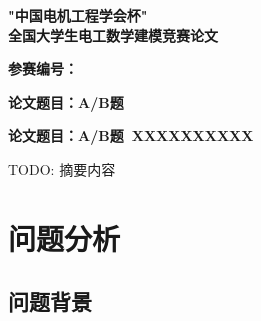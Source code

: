 



\coverpage
\begin{center}
  \vspace*{3cm}
  {\LARGE\bfseries "中国电机工程学会杯"\\全国大学生电工数学建模竞赛论文\par}
  \vspace{3cm}
  {\Large\bfseries 参赛编号：\underline{\hspace{6cm}}\par}
  \vspace{2cm}
  {\Large\bfseries 论文题目：A/B题~\underline{\hspace{7cm}}\par}
  \vfill
\end{center}
\newpage

\setcounter{page}{1}

\begin{center}
  {\Large\bfseries 论文题目：A/B题~XXXXXXXXXX\par}
\end{center}
\vspace{1em}

\begin{cnabstract}
  TODO: 摘要内容
\end{cnabstract}


\newpage


\section{问题分析}

\subsection{问题背景}

